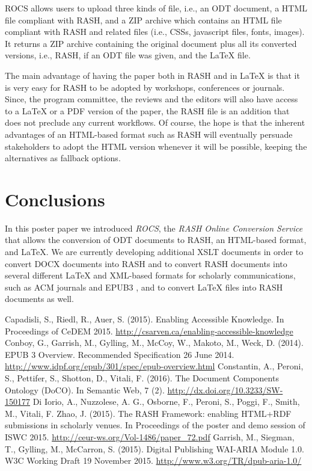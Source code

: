 \documentclass{sig-alternate}
\begin{document}
ROCS allows users to upload three kinds of file, i.e., an ODT document, a HTML file compliant with RASH, and a ZIP archive which contains an HTML file compliant with RASH and related files (i.e., CSSs, javascript files, fonts, images). It returns a ZIP archive containing the original document plus all its converted versions, i.e., RASH, if an ODT file was given, and the LaTeX file. 

The main advantage of having the paper both in RASH and in LaTeX is that it is very easy for RASH to be adopted by workshops, conferences or journals. Since, the program committee, the reviews and the editors will also have access to a LaTeX or a PDF version of the paper, the RASH file is an addition that does not preclude any current workflows. Of course, the hope is that the inherent advantages of an HTML-based format such as RASH will eventually persuade stakeholders to adopt the HTML version whenever it will be possible, keeping the alternatives as fallback options.

\section{Conclusions}\label{__RefHeading__2269_824787510}

In this poster paper we introduced {\em ROCS}, the {\em RASH Online Conversion Service} that allows the conversion of ODT documents to RASH, an HTML-based format, and LaTeX. We are currently developing additional XSLT documents in order to convert DOCX documents into RASH and to convert RASH documents into several different LaTeX and XML-based formats for scholarly communications, such as ACM journals and EPUB3  \cite{__RefNumPara__2978_824787510}, and to convert LaTeX files into RASH documents as well.

\begin{thebibliography}{4}

 Capadisli, S., Riedl, R., Auer, S. (2015). Enabling Accessible Knowledge. In Proceedings of CeDEM 2015. \url{http://csarven.ca/enabling-accessible-knowledge}
 Conboy, G., Garrish, M., Gylling, M., McCoy, W., Makoto, M., Weck, D. (2014). EPUB 3 Overview. Recommended Specification 26 June 2014. \url{http://www.idpf.org/epub/301/spec/epub-overview.html}
 Constantin, A., Peroni, S., Pettifer, S., Shotton, D., Vitali, F. (2016). The Document Components Ontology (DoCO). In Semantic Web, 7 (2). \url{http://dx.doi.org/10.3233/SW-150177}
 Di Iorio, A., Nuzzolese, A. G., Osborne, F., Peroni, S., Poggi, F., Smith, M., Vitali, F. Zhao, J. (2015). The RASH Framework: enabling HTML+RDF submissions in scholarly venues. In Proceedings of the poster and demo session of ISWC 2015. \url{http://ceur-ws.org/Vol-1486/paper\_72.pdf}
 Garrish, M., Siegman, T., Gylling, M., McCarron, S. (2015). Digital Publishing WAI-ARIA Module 1.0. W3C Working Draft 19 November 2015. \url{http://www.w3.org/TR/dpub-aria-1.0/}

\end{thebibliography}
\end{document}
